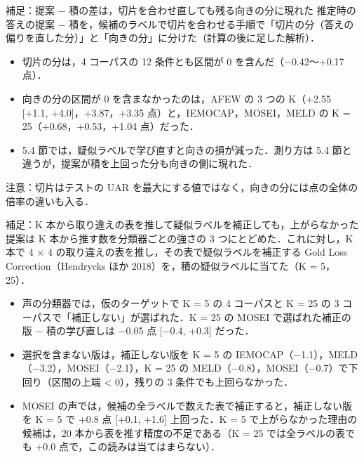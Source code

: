 \begin{frame}{補足：提案 − 積の差は，切片を合わせ直しても残る向きの分に現れた}
\footnotesize
推定時の答えの提案 − 積を，候補のラベルで切片を合わせる手順で「切片の分（答えの偏りを直した分）」と「向きの分」に分けた（計算の後に足した解析）．
\begin{itemize}\setlength\itemsep{5pt}
\item 切片の分は，4 コーパスの 12 条件とも区間が 0 を含んだ（$-$0.42〜+0.17 点）．
\item 向きの分の区間が 0 を含まなかったのは，AFEW の 3 つの K（+2.55 [+1.1, +4.0]，+3.87，+3.35 点）と，IEMOCAP，MOSEI，MELD の K = 25（+0.68，+0.53，+1.04 点）だった．
\item 5.4 節では，疑似ラベルで学び直すと向きの損が減った．測り方は 5.4 節と違うが，提案が積を上回った分も向きの側に現れた．
\end{itemize}
\vspace{0.3em}
注意：切片はテストの UAR を最大にする値ではなく，向きの分には点の全体の倍率の違いも入る．
\end{frame}

\begin{frame}{補足：K 本から取り違えの表を推して疑似ラベルを補正しても，上がらなかった}
\footnotesize
提案は K 本から推す数を分類器ごとの強さの 3 つにとどめた．これに対し，K 本で 4 × 4 の取り違えの表を推し，その表で疑似ラベルを補正する Gold Loss Correction（Hendrycks ほか 2018）を，積の疑似ラベルに当てた（K = 5，25）．
\begin{itemize}\setlength\itemsep{5pt}
\item 声の分類器では，仮のターゲットで K = 5 の 4 コーパスと K = 25 の 3 コーパスで「補正しない」が選ばれた．K = 25 の MOSEI で選ばれた補正の版 − 積の学び直しは $-$0.05 点 [$-$0.4, +0.3] だった．
\item 選択を含まない版は，補正しない版を K = 5 の IEMOCAP（$-$1.1），MELD（$-$3.2），MOSEI（$-$2.1），K = 25 の MELD（$-$0.8），MOSEI（$-$0.7）で下回り（区間の上端 < 0），残りの 3 条件でも上回らなかった．
\item MOSEI の声では，候補の全ラベルで数えた表で補正すると，補正しない版を K = 5 で +0.8 点 [+0.1, +1.6] 上回った．K = 5 で上がらなかった理由の候補は，20 本から表を推す精度の不足である（K = 25 では全ラベルの表でも +0.0 点で，この読みは当てはまらない）．
\end{itemize}
\end{frame}

